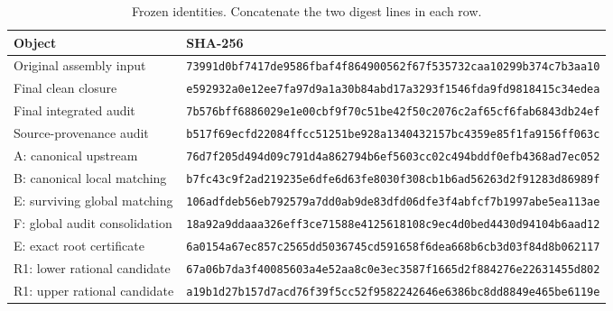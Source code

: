 \begin{longtable}{p{}p{}}
\caption{Frozen identities. Concatenate the two digest lines in each row.}\label{tab:hashes}\\
Object & SHA-256\\ \hline
Original assembly input & \texttt{73991d0bf7417de9586fbaf4f8649005}\newline\texttt{62f67f535732caa10299b374c7b3aa10}\\[3pt]
Final clean closure & \texttt{e592932a0e12ee7fa97d9a1a30b84abd}\newline\texttt{17a3293f1546fda9fd9818415c34edea}\\[3pt]
Final integrated audit & \texttt{7b576bff6886029e1e00cbf9f70c51be}\newline\texttt{42f50c2076c2af65cf6fab6843db24ef}\\[3pt]
Source-provenance audit & \texttt{b517f69ecfd22084ffcc51251be928a1}\newline\texttt{340432157bc4359e85f1fa9156ff063c}\\[3pt]
A: canonical upstream & \texttt{76d7f205d494d09c791d4a862794b6ef}\newline\texttt{5603cc02c494bddf0efb4368ad7ec052}\\[3pt]
B: canonical local matching & \texttt{b7fc43c9f2ad219235e6dfe6d63fe803}\newline\texttt{0f308cb1b6ad56263d2f91283d86989f}\\[3pt]
E: surviving global matching & \texttt{106adfdeb56eb792579a7dd0ab9de83d}\newline\texttt{fd06dfe3f4abfcf7b1997abe5ea113ae}\\[3pt]
F: global audit consolidation & \texttt{18a92a9ddaaa326eff3ce71588e41256}\newline\texttt{18108c9ec4d0bed4430d94104b6aad12}\\[3pt]
E: exact root certificate & \texttt{6a0154a67ec857c2565dd5036745cd59}\newline\texttt{1658f6dea668b6cb3d03f84d8b062117}\\[3pt]
R1: lower rational candidate & \texttt{67a06b7da3f40085603a4e52aa8c0e3e}\newline\texttt{c3587f1665d2f884276e22631455d802}\\[3pt]
R1: upper rational candidate & \texttt{a19b1d27b157d7acd76f39f5cc52f958}\newline\texttt{2242646e6386bc8dd8849e465be6119e}\\[3pt]
\end{longtable}
